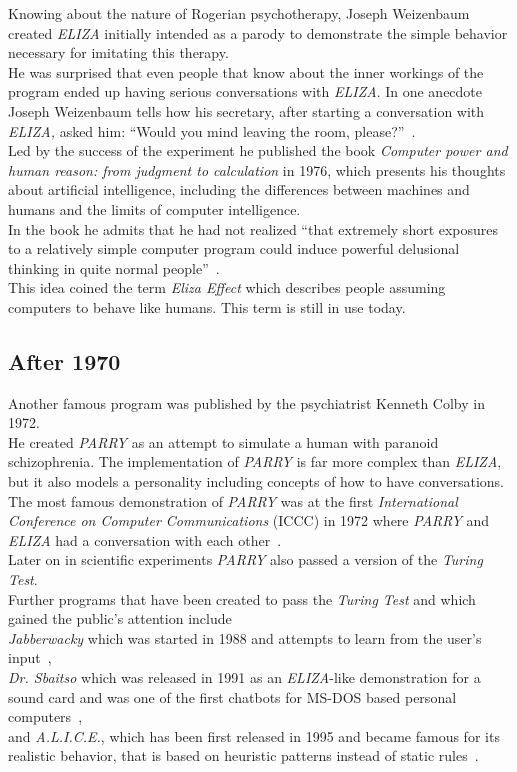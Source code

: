 Knowing about the nature of Rogerian psychotherapy, Joseph Weizenbaum created \emph{ELIZA} initially intended as a parody to demonstrate the simple behavior necessary for imitating this therapy.
\\
He was surprised that even people that know about the inner workings of the program ended up having serious conversations with \emph{ELIZA}.
In one anecdote Joseph Weizenbaum tells how his secretary, after starting a conversation with \emph{ELIZA,} asked him: ``Would you mind leaving the room, please?''~\cite[5]{weizenbaum}.
\\

Led by the success of the experiment he published the book \emph{Computer power and human reason: from judgment to calculation} in 1976,
which presents his thoughts about artificial intelligence,
including the differences between machines and humans and the limits of computer intelligence.
\\
In the book he admits that he had not realized ``that extremely short exposures to a relatively simple computer program could induce powerful delusional thinking in quite normal people''~\cite{bbcnowthen}.
\\
This idea coined the term \emph{Eliza Effect} which describes people assuming computers to behave like humans. This term is still in use today.


\subsection{After 1970}

Another famous program was published by the psychiatrist Kenneth Colby in 1972.
\\
He created \emph{PARRY} as an attempt to simulate a human with paranoid schizophrenia.
The implementation of \emph{PARRY} is far more complex than \emph{ELIZA},
but it also models a personality including concepts of how to have conversations.
\\
The most famous demonstration of \emph{PARRY} was at the first \emph{International Conference on Computer Communications} (ICCC) in 1972 where \emph{PARRY} and \emph{ELIZA} had a conversation with each other~\cite{internethistory}.
\\
Later on in scientific experiments \emph{PARRY} also passed a version of the \emph{Turing Test}.
\\

Further programs that have been created to pass the \emph{Turing Test} and which gained the public's attention include
\\
\emph{Jabberwacky} which was started in 1988 and attempts to learn from the user's input~\cite{jabberwacky},
\\
\emph{Dr. Sbaitso} which was released in 1991 as an \emph{ELIZA}-like demonstration for a sound card and was one of the first chatbots for MS-DOS based personal computers~\cite{pcmag},
\\
and \emph{A.L.I.C.E.}, which has been first released in 1995 and became famous for its realistic behavior, that is based on heuristic patterns instead of static rules~\cite{approximatinglife}.
\\

